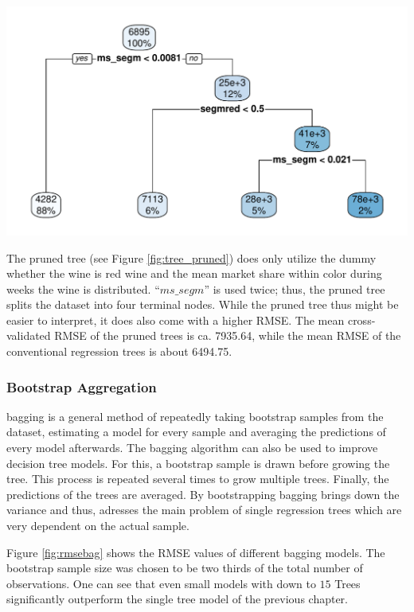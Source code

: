 \documentclass[11pt,]{article}
\let\origfigure\figure
\let\endorigfigure\endfigure
\renewenvironment{figure}[1][2] {
    \expandafter\origfigure\expandafter[H]
} {
    \endorigfigure
}
\begin{document}
\begin{figure}
\centering
\includegraphics{../00_data/output_paper/09_tree_pruned.pdf}
\caption{\label{fig:tree_pruned}Example of a Pruned Tree.}
\end{figure}

The pruned tree (see Figure \ref{fig:tree_pruned}) does only utilize the
dummy whether the wine is red wine and the mean market share within
color during weeks the wine is distributed. \enquote{\(ms\_segm\)} is
used twice; thus, the pruned tree splits the dataset into four terminal
nodes. While the pruned tree thus might be easier to interpret, it does
also come with a higher \ac{RMSE}. The mean cross-validated \ac{RMSE} of
the pruned trees is ca. 7935.64, while the mean \ac{RMSE} of the
conventional regression trees is about 6494.75.

\hypertarget{bootstrap-aggregation}{%
\subsubsection{Bootstrap Aggregation}\label{bootstrap-aggregation}}

\ac{bagging} is a general method of repeatedly taking bootstrap samples
from the dataset, estimating a model for every sample and averaging the
predictions of every model afterwards. The \ac{bagging} algorithm can
also be used to improve decision tree models. For this, a bootstrap
sample is drawn before growing the tree. This process is repeated
several times to grow multiple trees. Finally, the predictions of the
trees are averaged. By bootstrapping \ac{bagging} brings down the
variance and thus, adresses the main problem of single regression trees
which are very dependent on the actual sample.

Figure \ref{fig:rmsebag} shows the \ac{RMSE} values of different
\ac{bagging} models. The bootstrap sample size was chosen to be two
thirds of the total number of observations. One can see that even small
models with down to \(15\) Trees significantly outperform the single
tree model of the previous chapter.
\end{document}
